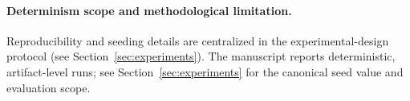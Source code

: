 \paragraph{Determinism scope and methodological limitation.}
Reproducibility and seeding details are centralized in the experimental-design protocol (see Section~\ref{sec:experiments}). The manuscript reports deterministic, artifact-level runs; see Section~\ref{sec:experiments} for the canonical seed value and evaluation scope.
